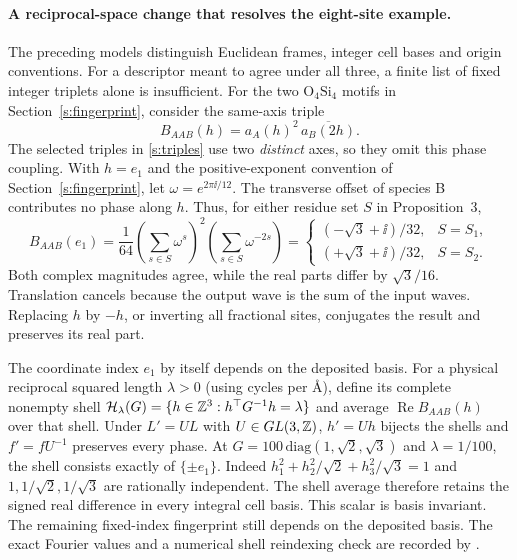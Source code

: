 \paragraph{A reciprocal-space change that resolves the eight-site example.}
The preceding models distinguish Euclidean frames, integer cell bases and origin conventions. For a descriptor meant to agree under all three, a finite list of fixed integer triplets alone is insufficient. For the two $\mathrm O_4\mathrm{Si}_4$ motifs in Section~\ref{s:fingerprint}, consider the same-axis triple
\begin{equation}
 B_{AAB}(h)=a_A(h)^2\,\overline{a_B(2h)}.
 \label{s:collinear}
\end{equation}
The selected triples in \eqref{s:triples} use two \emph{distinct} axes, so they omit this phase coupling. With $h=e_1$ and the positive-exponent convention of Section~\ref{s:fingerprint}, let $\omega=e^{2\pi\ii/12}$. The transverse offset of species B contributes no phase along $h$. Thus, for either residue set $S$ in Proposition~3,
\[
 B_{AAB}(e_1)=\frac1{64}\left(\sum_{s\in S}\omega^s\right)^2
                        \left(\sum_{s\in S}\omega^{-2s}\right)
   =\begin{cases}(-\sqrt3+\ii)/32,&S=S_1,\\
                  (+\sqrt3+\ii)/32,&S=S_2 .
     \end{cases}
\]
Both complex magnitudes agree, while the real parts differ by $\sqrt3/16$. Translation cancels because the output wave is the sum of the input waves. Replacing $h$ by $-h$, or inverting all fractional sites, conjugates the result and preserves its real part.

The coordinate index $e_1$ by itself depends on the deposited basis. For a physical reciprocal squared length $\lambda>0$ (using cycles per \AA), define its complete nonempty shell $\mathcal H_\lambda(G)=\{h\in\mathbb Z^3:h^\top G^{-1}h=\lambda\}$ and average $\operatorname{Re}B_{AAB}(h)$ over that shell. Under $L'=UL$ with $U\in GL(3,\mathbb Z)$, $h'=Uh$ bijects the shells and $f'=fU^{-1}$ preserves every phase. At $G=100\,\mathrm{diag}(1,\sqrt2,\sqrt3)$ and $\lambda=1/100$, the shell consists exactly of $\{\pm e_1\}$. Indeed $h_1^2+h_2^2/\sqrt2+h_3^2/\sqrt3=1$ and $1,1/\sqrt2,1/\sqrt3$ are rationally independent. The shell average therefore retains the signed real difference in every integral cell basis. This scalar is basis invariant. The remaining fixed-index fingerprint still depends on the deposited basis. The exact Fourier values and a numerical shell reindexing check are recorded by .

